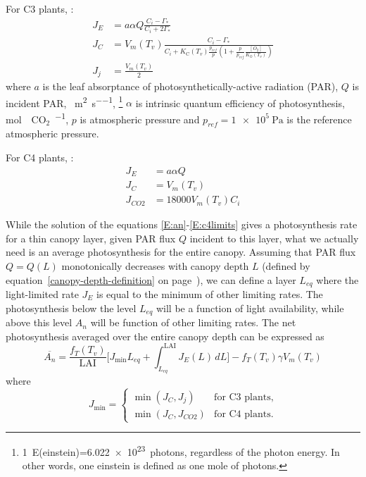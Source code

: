 \documentclass{article}
\newcommand{\LAI}{\ensuremath{\text{LAI}}}
\newcommand{\carbon}{\ensuremath{\mathrm{C}}}
\newcommand{\oxigen}{\ensuremath{\mathrm{O}}}
\newcommand{\cotwo}{\ensuremath{\mathrm{CO_2}}}
\newcommand{\anbar}{\ensuremath{\overline{A_n}}}
\begin{document}
For C3 plants, \cite{Collatz-etal-1991}:
\begin{subequations}\label{E:c3limits}
\begin{align}
   J_E &= a \alpha Q \frac{C_i - \Gamma_*}{C_i+2\Gamma_*} \\
   J_C &= V_m(T_v) \frac{C_i -\Gamma_*}{C_i + K_\carbon(T_v)\frac{p_{ref}}{p}
        \left(
            1+\frac{p}{p_{ref}}\frac{[O_2]}{K_\oxigen(T_v)}
	\right)
      } \\
   J_j &= \frac{V_m(T_v)}{2}
\end{align}
\end{subequations}
%
where
$a$ is the leaf absorptance of photosynthetically-active radiation (PAR), 
$Q$ is incident PAR, \si{\einstein\per\meter\squared\per\second},
%
\footnote{\SI{1}{E}(einstein)=\SI{6.022e23}{photons}, regardless of the photon
energy. In other words, one einstein is defined as one \si{mole} of photons.}
%
$\alpha$ is intrinsic quantum efficiency of photosynthesis,
    \si{\mole\of\cotwo\per\einstein}, 
$p$ is atmospheric pressure and 
$p_{ref}=\SI{1e5}{\pascal}$ is the reference atmospheric pressure.

For C4 plants, \cite{Collatz-etal-1992}:
%
\begin{subequations}\label{E:c4limits}
\begin{align}
   J_E &= a \alpha Q\\
   J_C &= V_m(T_v)\\
   J_{CO2} &= 18000 V_m(T_v) C_i 
\end{align}
\end{subequations}

While the solution of the equations \eqref{E:an}-\eqref{E:c4limits} gives a
photosynthesis rate for a thin canopy layer, given PAR flux $Q$ incident to this
layer, what we actually need is an average photosynthesis for the entire canopy.
Assuming that PAR flux $Q=Q(L)$ monotonically decreases with canopy depth $L$
(defined by equation~\eqref{canopy-depth-definition} on
page~\pageref{canopy-depth-definition}), we can define a layer $L_{eq}$ where
the light-limited rate $J_E$ is equal to the minimum of other limiting rates.
The photosynthesis below the level $L_{eq}$ will be a function of light
availability, while above this level $A_n$ will be function of other limiting
rates. The net photosynthesis averaged over the entire canopy depth can be
expressed as
%
\begin{equation}\label{E:anbar}
   \anbar = \frac{f_T(T_v)}{\LAI}\Bigg[
      J_{\min} L_{eq} +
      \int_{L_{eq}}^{\LAI}J_E(L)\,dL 
   \Bigg]
   -f_T(T_v)\gamma V_m(T_v)
\end{equation}
%
where
%
\begin{equation}
   J_{\min} = \begin{cases}
      \min(J_C, J_j)      & \text{for C3 plants}, \\
      \min(J_C, J_{CO2})  & \text{for C4 plants}.
   \end{cases}
\end{equation}
\end{document}
